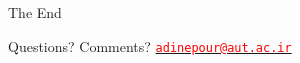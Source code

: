 \documentclass[
	12pt, %
]{beamer}
\begin{document}

\begin{frame}[plain] %
	\begin{center}
		{\Huge The End}
		
		\bigskip\bigskip %
		
		{\LARGE Questions? Comments?}\vfil
		\texttt{\href{mailto:adinepour@aut.ac.ir}{\textcolor{red}{adinepour@aut.ac.ir}}}
	\end{center}
\end{frame}

\end{document}
